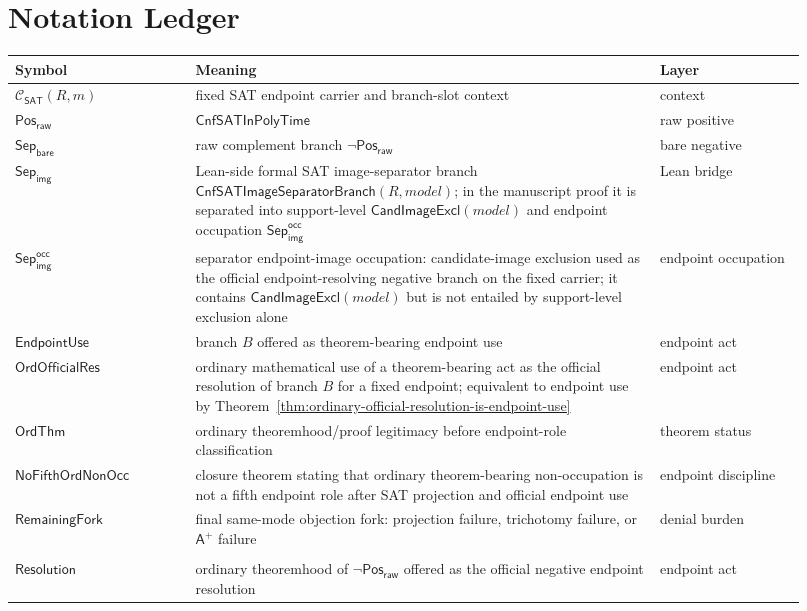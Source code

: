 \documentclass[11pt]{article}
\theoremstyle{definition}
\theoremstyle{remark}
\newcommand{\PosRaw}{\mathsf{Pos}_{\mathsf{raw}}}
\newcommand{\SepBare}{\mathsf{Sep}_{\mathsf{bare}}}
\newcommand{\SepImg}{\mathsf{Sep}_{\mathsf{img}}}
\newcommand{\SepImgOcc}{\mathsf{Sep}_{\mathsf{img}}^{\mathsf{occ}}}
\newcommand{\Aplus}{\mathsf{A}^{+}}
\newcommand{\CnfSATP}{\mathsf{CnfSATInPolyTime}}
\newcommand{\CnfImageSep}{\mathsf{CnfSATImageSeparatorBranch}}
\newcommand{\ClayCtx}{\mathcal{C}_{\mathsf{SAT}}(R,m)}
\newcommand{\EndpointUse}{\mathsf{EndpointUse}}
\newcommand{\CandImageExcl}{\mathsf{CandImageExcl}}
\newcommand{\OrdThm}{\mathsf{OrdThm}}
\newcommand{\OrdOfficialRes}{\mathsf{OrdOfficialRes}}
\begin{document}
\section{Notation Ledger}
\begin{longtable}{>{\raggedright\arraybackslash}p{0.21\linewidth}>{\raggedright\arraybackslash}p{0.54\linewidth}>{\raggedright\arraybackslash}p{0.17\linewidth}}
\toprule
Symbol & Meaning & Layer \\
\midrule
\(\ClayCtx\) & fixed SAT endpoint carrier and branch-slot context & context \\
\(\PosRaw\) & \(\CnfSATP\) & raw positive \\
\(\SepBare\) & raw complement branch \(\neg\PosRaw\) & bare negative \\
\(\SepImg\) & Lean-side formal SAT image-separator branch \(\CnfImageSep(R,model)\); in the manuscript proof it is separated into support-level \(\CandImageExcl(model)\) and endpoint occupation \(\SepImgOcc\) & Lean bridge \\
\(\SepImgOcc\) & separator endpoint-image occupation: candidate-image exclusion used as the official endpoint-resolving negative branch on the fixed carrier; it contains \(\CandImageExcl(model)\) but is not entailed by support-level exclusion alone & endpoint occupation \\
\(\EndpointUse\) & branch \(B\) offered as theorem-bearing endpoint use & endpoint act \\
\(\OrdOfficialRes\) & ordinary mathematical use of a theorem-bearing act as the official resolution of branch \(B\) for a fixed endpoint; equivalent to endpoint use by Theorem~\ref{thm:ordinary-official-resolution-is-endpoint-use} & endpoint act \\
\(\OrdThm\) & ordinary theoremhood/proof legitimacy before endpoint-role classification & theorem status \\
\(\mathsf{NoFifthOrdNonOcc}\) & closure theorem stating that ordinary theorem-bearing non-occupation is not a fifth endpoint role after SAT projection and official endpoint use & endpoint discipline \\
\(\mathsf{RemainingFork}\) & final same-mode objection fork: projection failure, trichotomy failure, or \(\Aplus\) failure & denial burden \\
\begin{tabular}[t]{@{}l@{}}\(\mathsf{OfficialEndpoint}\)\\\(\mathsf{Resolution}\)\end{tabular} & ordinary theoremhood of \(\neg\PosRaw\) offered as the official negative endpoint resolution & endpoint act \\

\end{longtable}
\end{document}
